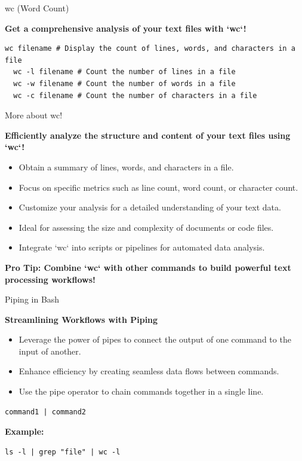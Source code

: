 \documentclass{beamer}
\begin{document}
\begin{frame}[fragile]{wc (Word Count)}

  \textbf{Get a comprehensive analysis of your text files with `wc`!}

  \begin{lstlisting}[frame=none]
  wc filename # Display the count of lines, words, and characters in a file
  wc -l filename # Count the number of lines in a file
  wc -w filename # Count the number of words in a file
  wc -c filename # Count the number of characters in a file
  \end{lstlisting}

\end{frame}

\begin{frame}{More about wc!}

  \textbf{Efficiently analyze the structure and content of your text files using `wc`!}

  \begin{itemize}
    \item Obtain a summary of lines, words, and characters in a file.
    \item Focus on specific metrics such as line count, word count, or character count.
    \item Customize your analysis for a detailed understanding of your text data.
    \item Ideal for assessing the size and complexity of documents or code files.
    \item Integrate `wc` into scripts or pipelines for automated data analysis.
  \end{itemize}

  \textbf{Pro Tip: Combine `wc` with other commands to build powerful text processing workflows!}

\end{frame}

\begin{frame}[fragile]{Piping in Bash}

  \textbf{Streamlining Workflows with Piping}

  \begin{itemize}
    \item Leverage the power of pipes to connect the output of one command to the input of another.
    \item Enhance efficiency by creating seamless data flows between commands.
    \item Use the pipe operator \text{\textbar} to chain commands together in a single line.
  \end{itemize}

  \begin{lstlisting}[frame=none]
  command1 | command2
  \end{lstlisting}

  \textbf{Example:}

  \begin{lstlisting}[frame=none]
  ls -l | grep "file" | wc -l
  \end{lstlisting}

\end{frame}
\end{document}
